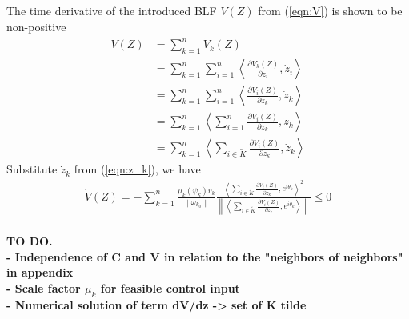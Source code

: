 \documentclass[journal]{IEEEtran}
\newcommand{\norm}[1]{\left\lVert#1\right\rVert}
\begin{document}
\noindent The time derivative of the introduced BLF $V(Z)$ from (\ref{eqn:V}) is shown to be non-positive
\begin{equation} 
\begin{split}
\dot V(Z) & =  \sum^{n}_{k=1} \dot V_k(Z) \\
& = \sum^{n}_{k=1} \sum^{n}_{i=1} \left< \frac{\partial  V_k(Z)}{\partial z_i}, \dot z_i \right > \\
& = \sum^{n}_{k=1} \sum^{n}_{i=1} \left< \frac{\partial  V_i(Z)}{\partial z_k}, \dot z_k \right > \\
& = \sum^{n}_{k=1} \left< \sum^{n}_{i=1} \frac{\partial V_i(Z)}{\partial z_k} , \dot z_k \right > \\
& = \sum^{n}_{k=1} \left< \sum^{}_{i \in \tilde{K}} \frac{\partial V_i(Z)}{\partial z_k} , \dot z_k \right >
\end{split}
\end{equation}
Substitute $\dot z_k$ from (\ref{eqn:z_k}), we have
\begin{equation} \label{eqn:V_dot}
\begin{split}
\dot V(Z) = - \sum^{n}_{k=1} 			\frac{\mu_k(\psi_{k})v_k}{\norm{\omega_{k_0}}} 		\frac{\left<\sum^{}_{i \in \tilde{K}} \frac{\partial V_i(Z)}{\partial z_k}, e^{i\theta_{k}} \right >^2}   	 {\norm{\left <\sum_{i \in \tilde{K}}\frac{\partial V_i(Z)}{\partial z_k}, e^{i\theta_k} \right >}} \leq 0\\ 
\end{split}
\end{equation}

\textbf{
TO DO. \\
- Independence of C and V in relation to the "neighbors of neighbors" in appendix\\
- Scale factor $ \mu_k $ for feasible control input \\
- Numerical solution of term dV/dz -> set of K tilde \\ }
\end{document}
